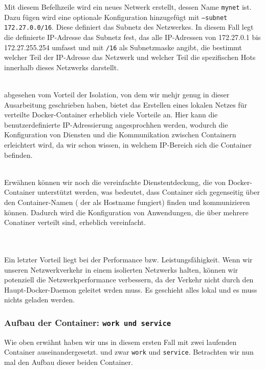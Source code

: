 Mit diesem Befelhzeile wird ein neues Netwerk erstellt, dessen Name \texttt{mynet} ist. Dazu fügen wird eine optionale Konfiguration hinzugefügt mit \texttt{--subnet 172.27.0.0/16}. Diese definiert das Subnetz des Netzwerkes. In diesem Fall legt die definierte IP-Adresse das Subnetz fest, das alle IP-Adressen von 172.27.0.1 bis 172.27.255.254 umfasst und mit \texttt{/16} als Subnetzmaske angibt, die bestimmt welcher Teil der IP-Adresse das Netzwerk und welcher Teil die spezifischen Hots innerhalb dieses Netzwerks darstellt.

\\

abgesehen vom Vorteil der Isolation, von dem wir mehjr genug in dieser Ausarbeitung geschrieben haben, bietet das Erstellen eines lokalen Netzes für verteilte Docker-Container erheblich viele Vorteile an. Hier kann die benutzerdefinierte IP-Adressierung angesprochhen werden, wodurch die Konfiguration von Diensten und die Kommunikation zwischen Containern  erleichtert wird, da wir schon wissen, in welchem IP-Bereich sich die Container befinden.

\\

Erwähnen können wir noch die vereinfachte Dienstentdeckung, die von Docker-Container unterstützt werden, was bedeutet, dass Container sich gegenseitig über den Container-Namen ( der als Hostname fungiert) finden und kommunizieren können. Dadurch wird die Konfiguration von Anwendungen, die über mehrere Conatiner verteilt sind, erheblich vereinfacht.

\\
\\

Ein letzter Vorteil liegt bei der Performance bzw. Leistungsfähigkeit. Wenn wir unseren Netzwerkverkehr in einem isolierten Netzwerks halten, können wir potenziell die Netzwerkperformance verbessern, da der Verkehr nicht durch den Haupt-Docker-Daemon geleitet wrden muss. Es geschieht alles lokal und es muss nichts geladen werden.


\subsubsection{Aufbau der Container: \texttt{work und service}}

Wie oben erwähnt haben wir uns in diesem ersten Fall mit zwei laufenden Container auseinandergesetzt. und zwar \texttt{work} und \texttt{service}. Betrachten wir nun mal den Aufbau dieser beiden Container.

